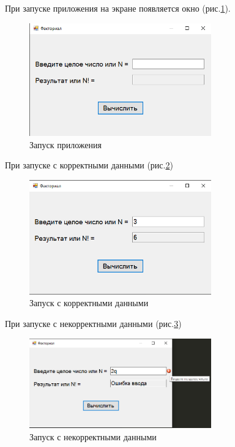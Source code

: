 При запуске приложения на экране появляется окно (рис.\ref{fig:StartForm1}).

\begin{figure}[!h]
    \centering
    \includegraphics[width = 0.7\textwidth]{images/Task1/Start.png}
    \caption{Запуск приложения}
    \label{fig:StartForm1}
\end{figure}

При запуске с корректными данными (рис.\ref{fig:WorkForm1})

\begin{figure}[!h]
    \centering
    \includegraphics[width = 0.7\textwidth]{images/Task1/Work.png}
    \caption{Запуск с корректными данными}
    \label{fig:WorkForm1}
\end{figure}

При запуске с некорректными данными (рис.\ref{fig:BadInputNotIntForm1})

\begin{figure}[!h]
    \centering
    \includegraphics[width = 0.7\textwidth]{images/Task1/BadInputNotInt.png}
    \caption{Запуск с некорректными данными}
    \label{fig:BadInputNotIntForm1}
\end{figure}
